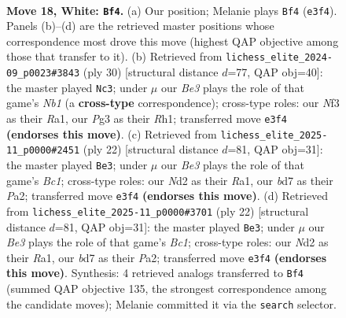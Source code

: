 \documentclass[11pt]{article}
\begin{document}
\clearpage

\begin{figure}[p]\centering
\begin{subfigure}{0.46\textwidth}\centering
\resizebox{\linewidth}{!}{%
\newchessgame
\chessboard[
  setfen={1r3b1r/1p1b1k1p/p1n1p1p1/4Pp2/n7/4BNP1/PP1N1P1P/R1K2BR1 w - - 0 18},
  showmover=false,
  pgfstyle=straightmove, color=movearrow, markmove={e3-f4}
]}
\caption{}
\end{subfigure}\hfill
\begin{subfigure}{0.46\textwidth}\centering
\resizebox{\linewidth}{!}{%
\newchessgame
\chessboard[
  setfen={r4b1r/pbk2ppp/1pn5/2ppPB2/5B2/P4N2/1P3PPP/RN2K2R w KQ - 1 16},
  showmover=false,
  pgfstyle=straightmove, color=movearrow, markmove={b1-c3}
]}
\caption{}
\end{subfigure}
\\[4pt]
\begin{subfigure}{0.46\textwidth}\centering
\resizebox{\linewidth}{!}{%
\newchessgame
\chessboard[
  setfen={r1b1kb1r/ppp2ppp/2p3n1/4P3/8/2N2N1P/PPP2PP1/R1BR2K1 w - - 1 12},
  showmover=false,
  pgfstyle=straightmove, color=movearrow, markmove={c1-e3}
]}
\caption{}
\end{subfigure}\hfill
\begin{subfigure}{0.46\textwidth}\centering
\resizebox{\linewidth}{!}{%
\newchessgame
\chessboard[
  setfen={r1b1kb1r/ppp2ppp/2p3n1/4P3/8/2N2N1P/PPP2PP1/R1BR2K1 w - - 1 12},
  showmover=false,
  pgfstyle=straightmove, color=movearrow, markmove={c1-e3}
]}
\caption{}
\end{subfigure}
\caption{\textbf{Move 18, White: \texttt{Bf4}.} (a) Our position; Melanie plays \texttt{Bf4} (\texttt{e3f4}). Panels (b)--(d) are the retrieved master positions whose correspondence most drove this move (highest QAP objective among those that transfer to it). (b) Retrieved from \texttt{lichess\_elite\_2024-09\_p0023\#3843} (ply 30) [structural distance $d$=77, QAP obj=40]: the master played \texttt{Nc3}; under $\mu$ our \emph{Be3} plays the role of that game's \emph{Nb1} (a \textbf{cross-type} correspondence); cross-type roles: our \emph{N}f3 as their \emph{R}a1, our \emph{P}g3 as their \emph{R}h1; transferred move \texttt{e3f4} \textbf{(endorses this move)}. (c) Retrieved from \texttt{lichess\_elite\_2025-11\_p0000\#2451} (ply 22) [structural distance $d$=81, QAP obj=31]: the master played \texttt{Be3}; under $\mu$ our \emph{Be3} plays the role of that game's \emph{Bc1}; cross-type roles: our \emph{N}d2 as their \emph{R}a1, our \emph{b}d7 as their \emph{P}a2; transferred move \texttt{e3f4} \textbf{(endorses this move)}. (d) Retrieved from \texttt{lichess\_elite\_2025-11\_p0000\#3701} (ply 22) [structural distance $d$=81, QAP obj=31]: the master played \texttt{Be3}; under $\mu$ our \emph{Be3} plays the role of that game's \emph{Bc1}; cross-type roles: our \emph{N}d2 as their \emph{R}a1, our \emph{b}d7 as their \emph{P}a2; transferred move \texttt{e3f4} \textbf{(endorses this move)}. Synthesis: 4 retrieved analogs transferred to \texttt{Bf4} (summed QAP objective 135, the strongest correspondence among the candidate moves); Melanie committed it via the \texttt{search} selector.}
\label{fig:thought-m34}
\end{figure}
\end{document}
